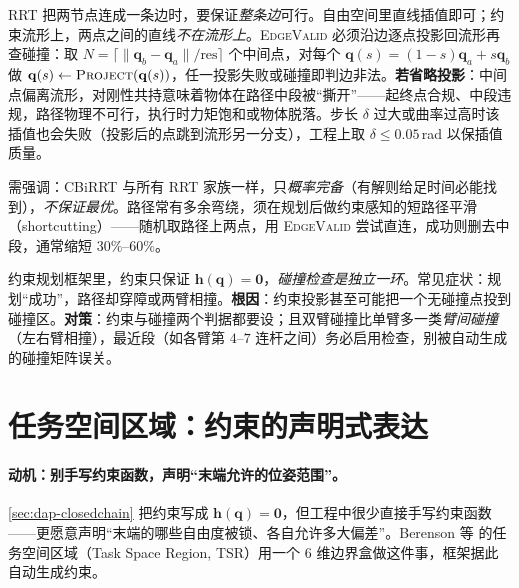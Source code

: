 \begin{derivation}[约束感知边检查为何不可省]\label{der:dap-edge}
RRT 把两节点连成一条边时，要保证\emph{整条边}可行。自由空间里直线插值即可；约束流形上，两点之间的直线\emph{不在流形上}。\textsc{EdgeValid} 必须沿边逐点投影回流形再查碰撞：取 $N=\lceil\|\mathbf{q}_b-\mathbf{q}_a\|/\text{res}\rceil$ 个中间点，对每个 $\mathbf{q}(s)=(1-s)\mathbf{q}_a+s\mathbf{q}_b$ 做 $\mathbf{q}(s)\leftarrow\textsc{Project}(\mathbf{q}(s))$，任一投影失败或碰撞即判边非法。\textbf{若省略投影}：中间点偏离流形，对刚性共持意味着物体在路径中段被“撕开”——起终点合规、中段违规，路径物理不可行，执行时力矩饱和或物体脱落。步长 $\delta$ 过大或曲率过高时该插值也会失败（投影后的点跳到流形另一分支），工程上取 $\delta\le0.05$\,rad 以保插值质量。
\end{derivation}

需强调：CBiRRT 与所有 RRT 家族一样，只\emph{概率完备}（有解则给足时间必能找到），\emph{不保证最优}。路径常有多余弯绕，须在规划后做约束感知的短路径平滑（shortcutting）——随机取路径上两点，用 \textsc{EdgeValid} 尝试直连，成功则删去中段，通常缩短 $30\%$--$60\%$。

\begin{pitfall}
约束规划框架里，约束只保证 $\mathbf{h}(\mathbf{q})=\mathbf{0}$，\emph{碰撞检查是独立一环}。常见症状：规划“成功”，路径却穿障或两臂相撞。\textbf{根因}：约束投影甚至可能把一个无碰撞点投到碰撞区。\textbf{对策}：约束与碰撞两个判据都要设；且双臂碰撞比单臂多一类\emph{臂间碰撞}（左右臂相撞），最近段（如各臂第 $4$--$7$ 连杆之间）务必启用检查，别被自动生成的碰撞矩阵误关。
\end{pitfall}

\section{任务空间区域：约束的声明式表达}
\label{sec:dap-tsr}

\paragraph{动机：别手写约束函数，声明“末端允许的位姿范围”。}
\cref{sec:dap-closedchain} 把约束写成 $\mathbf{h}(\mathbf{q})=\mathbf{0}$，但工程中很少直接手写约束函数——更愿意声明“末端的哪些自由度被锁、各自允许多大偏差”。Berenson 等\cite{berenson2011tsr} 的任务空间区域（Task Space Region, TSR）用一个 $6$ 维边界盒做这件事，框架据此自动生成约束。

